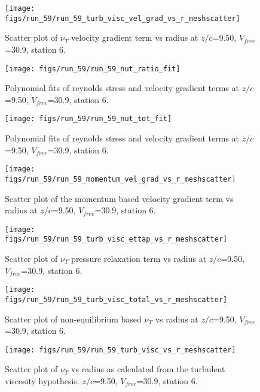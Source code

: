 \begin{figure}[H]
\centering
\texttt{[image: figs/run\_59/run\_59\_turb\_visc\_vel\_grad\_vs\_r\_meshscatter]}
\caption{Scatter plot of $\nu_T$ velocity gradient term vs radius at $z/c$=9.50, $V_{free}$=30.9, station 6.}
\end{figure}


\begin{figure}[H]
\centering
\texttt{[image: figs/run\_59/run\_59\_nut\_ratio\_fit]}
\caption{Polynomial fits of reynolds stress and velocity gradient terms at $z/c$=9.50, $V_{free}$=30.9, station 6.}
\end{figure}


\begin{figure}[H]
\centering
\texttt{[image: figs/run\_59/run\_59\_nut\_tot\_fit]}
\caption{Polynomial fits of reynolds stress and velocity gradient terms at $z/c$=9.50, $V_{free}$=30.9, station 6.}
\end{figure}


\begin{figure}[H]
\centering
\texttt{[image: figs/run\_59/run\_59\_momentum\_vel\_grad\_vs\_r\_meshscatter]}
\caption{Scatter plot of the momentum based velocity gradient term vs radius at $z/c$=9.50, $V_{free}$=30.9, station 6.}
\end{figure}


\begin{figure}[H]
\centering
\texttt{[image: figs/run\_59/run\_59\_turb\_visc\_ettap\_vs\_r\_meshscatter]}
\caption{Scatter plot of $\nu_T$ pressure relaxation term vs radius at $z/c$=9.50, $V_{free}$=30.9, station 6.}
\end{figure}


\begin{figure}[H]
\centering
\texttt{[image: figs/run\_59/run\_59\_turb\_visc\_total\_vs\_r\_meshscatter]}
\caption{Scatter plot of non-equilibrium based $\nu_T$ vs radius at $z/c$=9.50, $V_{free}$=30.9, station 6.}
\end{figure}


\begin{figure}[H]
\centering
\texttt{[image: figs/run\_59/run\_59\_turb\_visc\_vs\_r\_meshscatter]}
\caption{Scatter plot of $\nu_T$ vs radius as calculated from the turbulent viscosity hypothesis. $z/c$=9.50, $V_{free}$=30.9, station 6.}
\end{figure}



